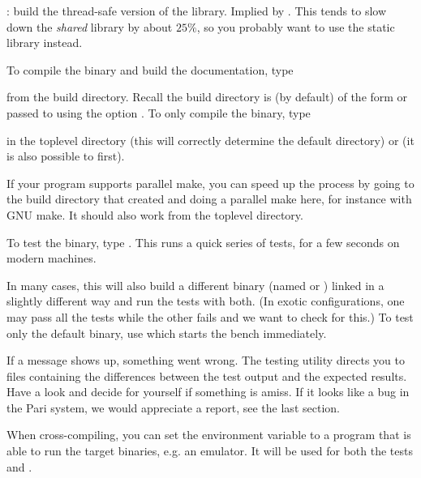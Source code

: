 : build the thread-safe version of the library. Implied by
. This tends to slow down the \emph{shared} library
 by about $25\%$, so you probably want to use the static
library  instead.

 To compile the  binary and build the
documentation, type


\noindent from the build directory. Recall the build directory is
(by default) of the form  or
passed to  using the option
. To only compile the  binary, type


\noindent in the toplevel directory (this will correctly determine
the  default directory) or  (it is also possible to  first).

If your  program supports parallel make, you can speed up the
process by going to the build directory that  created and
doing a parallel make here, for instance  with GNU make. It
should also work from the toplevel directory.


To test the binary, type . This runs a quick series of
tests, for a few seconds on modern machines.

In many cases, this will also build a different binary (named  or
) linked in a slightly different way and run the tests with both.
(In exotic configurations, one may pass all the tests while the other fails
and we want to check for this.) To test only the default binary, use
 which starts the bench immediately.

If a \kbd{[BUG]} message shows up, something went wrong. The testing utility
directs you to files containing the differences between the test output and
the expected results. Have a look and decide for yourself if something is
amiss. If it looks like a bug in the Pari system, we would appreciate a
report, see the last section.


When cross-compiling, you can set the environment variable  to a
program that is able to run the target binaries, e.g. an emulator. It will be
used for both the  tests and .

